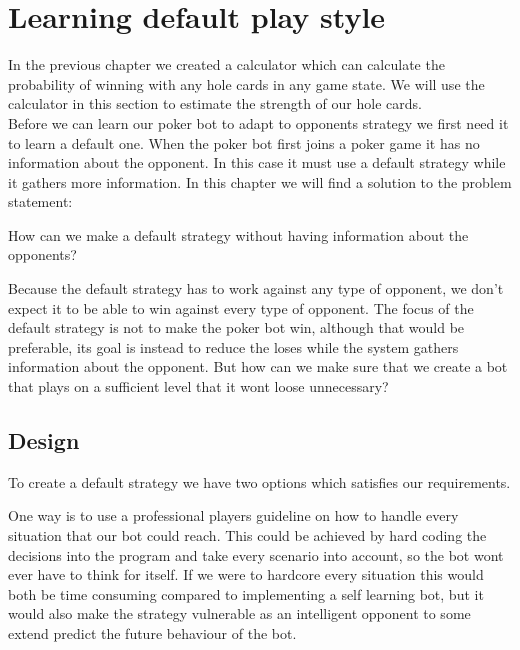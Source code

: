 \section{Learning default play style}
\label{sec:part2}
In the previous chapter we created a calculator which can calculate the probability of winning with any hole cards in any game state. We will use the calculator in this section to estimate the strength of our hole cards.\\

Before we can learn our poker bot to adapt to opponents strategy we first need it to learn a default one. When the poker bot first joins a poker game it has no information about the opponent. In this case it must use a default strategy while it gathers more information.
In this chapter we will find a solution to the problem statement:

\vspace{4mm}
\begin{statementBox}
How can we make a default strategy without having information about the opponents?
\end{statementBox}
\vspace{4mm}

Because the default strategy has to work against any type of opponent, we don't expect it to be able to win against every type of opponent. The focus of the default strategy is not to make the poker bot win, although that would be preferable, its goal is instead to reduce the loses while the system gathers information about the opponent. But how can we make sure that we create a bot that plays on a sufficient level that it wont loose unnecessary?


\subsection{Design}
To create a default strategy we have two options which satisfies our requirements.

One way is to use a professional players guideline on how to handle every situation that our bot could reach. This could be achieved by hard coding the decisions into the program and take every scenario into account, so the bot wont ever have to think for itself. If we were to hardcore every situation this would both be time consuming compared to implementing a self learning bot, but it would also make the strategy vulnerable as an intelligent opponent to some extend predict the future behaviour of the bot.


